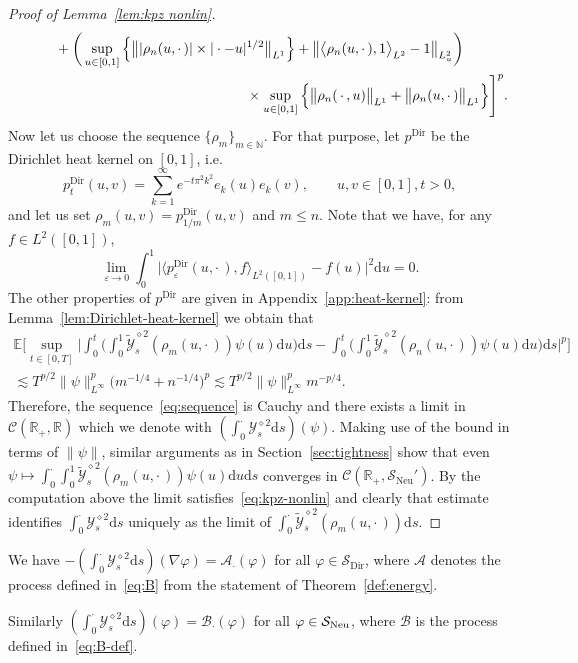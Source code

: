 \documentclass[10pt]{amsart}
\theoremstyle{definition}\newtheorem{defi}[theo]{Definition}\newtheorem{rema}[theo]{Remark}\newtheorem{exam}[theo]{Example}\newtheorem{exem}[theo]{Example}\newtheorem{nota}[theo]{Notation}
\DeclareMathOperator{\Dir}{Dir}
\DeclareMathOperator{\Neu}{Neu}
\newcommand{\bb}[1]{{\mathbb #1}}
\newcommand{\mc}[1]{{\mathcal #1}}
\renewcommand{\mc}[1]{{\mathcal #1}}
\newcommand{\Ctwo}{\ensuremath{\mc S_{\Dir}}}
\newcommand{\SN}{\ensuremath{\mc S_{\Neu}}}
\renewcommand{\leq}{\leqslant}
\newcommand*{\dd}{\mathrm{d}}
\newcommand*{\ds}{\dd s}
\newcommand*{\du}{\dd u}
\begin{document}
\begin{proof}[Proof of Lemma~\ref{lem:kpz nonlin}]
\begin{align*}
& \qquad \quad + \bigg(\sup_{u\in[0,1]} \Big\{ \big\| | \rho_n (u, \cdot\,) | \times | \cdot - u |^{1/2}\big\|_{L^1} \Big\} + \big\| \big\langle \rho_n (u, \cdot\,), 1 \big\rangle_{L^2} - 1 \big\|_{L^2_u} \bigg)\\
&\mkern 300mu \times \sup_{u\in[0,1]} \Big\{ \big\| \rho_n (\,\cdot\,, u) \big\|_{L^1} + \big\| \rho_n (u, \cdot\,)\big\|_{L^1} \Big\} \Bigg]^p.
\end{align*}
Now let us choose the sequence $\{\rho_m\}_{m \in \bb N}$. For that purpose, let $p^{\Dir}$ be the Dirichlet heat kernel on $[0, 1]$, i.e.
\begin{equation}\label{eq:dirker}
p^{\Dir}_t (u, v) = \sum_{k = 1}^{\infty} e^{- t \pi^2 k^2} e_k (u) e_k (v), \qquad u,v\in[0,1], t > 0,
\end{equation}
and let us set $\rho_m (u, v) = p^{\Dir}_{1 / m} (u, v) $ and $m \leq n$. Note that we have, for any $f \in L^2([0,1])$,
\[
\lim_{\varepsilon \to 0} \int_0^1 \big|\langle p_\varepsilon^{\Dir}(u,\cdot\,), f\rangle_{L^2([0,1])} - f(u)\big|^2 \du = 0.
\]
The other properties of $p^{\Dir}$ are given in Appendix~\ref{app:heat-kernel}: from Lemma~\ref{lem:Dirichlet-heat-kernel} we obtain that
\begin{multline*}
\!\mathbb{E} \bigg[\sup_{t \in [0, T]} \bigg| \int_0^t \bigg(\int_0^1
\widetilde{\mc Y}^{\diamond 2}_s (\rho_m (u, \cdot\,)) \psi (u) \du\bigg) \ds - \int_0^t \bigg(\int_0^1 \widetilde{\mc Y}^{\diamond 2}_s (\rho_n (u, \cdot\,)) \psi (u) \du \bigg) \ds \bigg|^p \bigg]\\
\lesssim T^{p / 2} \big\| \psi \big\|^p_{L^{\infty}} \big(m^{- 1 / 4} + n^{- 1 / 4}\big)^p \lesssim T^{p / 2} \big\| \psi \big\|^p_{L^{\infty}} m^{- p / 4}.\!
\end{multline*}
Therefore, the sequence~\eqref{eq:sequence} is Cauchy and there exists a limit in $\mc C (\mathbb{R}_+,
\bb R)$ which we denote with $(\int_0^{\cdot} \mc Y_s^{\diamond 2} \ds) (\psi)$. Making use of the bound in terms of $\|\psi\|$, similar arguments as in Section~\ref{sec:tightness} show that even $\psi \mapsto \int_0^\cdot \int_0^1\widetilde{\mc Y}_s^{\diamond 2}(\rho_m(u,\cdot\,))\psi(u)\du \ds$ converges in $\mc C (\mathbb{R}_+,\SN')$. By the computation above the limit satisfies~\eqref{eq:kpz-nonlin} and clearly that estimate identifies $\int_0^{\cdot} \mc Y_s^{\diamond 2} \ds$ uniquely as the limit of $\int_0^{\cdot} \widetilde{\mc Y}^{\diamond 2}_s (\rho_m (u, \cdot\,)) \ds$.
\end{proof}

\begin{coro}\label{cor:kpz-nonlin-A-B}
We have $- (\int_0^\cdot \mc Y^{\diamond 2}_s \ds)(\nabla \varphi) = \mc A_\cdot(\varphi)$ for all $\varphi \in \Ctwo$, where $\mc A$ denotes the process defined in~\eqref{eq:B} from the statement of Theorem~\ref{def:energy}.

Similarly $(\int_0^\cdot \mc Y^{\diamond 2}_s \ds)(\varphi) = \mc B_\cdot(\varphi)$ for all $\varphi \in \mc S_{\rm{Neu}}$, where $\mc B$ is the process defined in~\eqref{eq:B-def}.
\end{coro}
\end{document}
